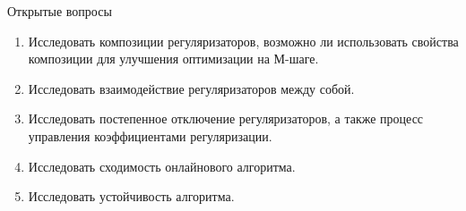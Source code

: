 \documentclass[utf8]{beamer}
\begin{document}
\begin{frame}{Открытые вопросы}
\begin{enumerate}
\item Исследовать композиции регуляризаторов, возможно ли использовать свойства композиции для улучшения оптимизации на М-шаге.
\item Исследовать взаимодействие регуляризаторов между собой.
\item Исследовать постепенное отключение регуляризаторов, а также процесс управления коэффициентами регуляризации.
\item Исследовать сходимость онлайнового алгоритма.
\item Исследовать устойчивость алгоритма.
\end{enumerate}
\end{frame}
\end{document}
